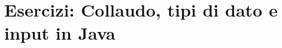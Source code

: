 \chapter{Esercizi: Collaudo, tipi di dato e input in Java}
\label{chap:esercizi-collaudo-tipi-input-java}